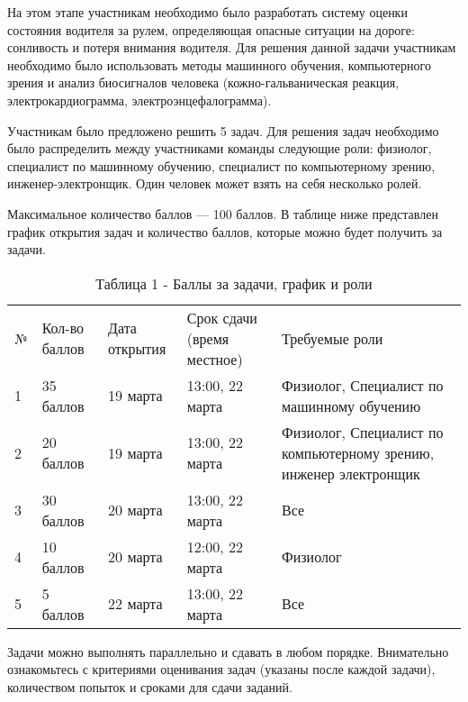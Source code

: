 На этом этапе участникам необходимо было разработать систему оценки состояния водителя за рулем, определяющая опасные ситуации на дороге: сонливость и потеря внимания водителя. Для решения данной задачи участникам необходимо было использовать методы машинного обучения, компьютерного зрения и анализ биосигналов человека (кожно-гальваническая реакция, электрокардиограмма, электроэнцефалограмма).

Участникам было предложено решить 5 задач. Для решения задач необходимо было распределить между участниками команды следующие роли: физиолог, специалист по машинному обучению, специалист по компьютерному зрению, инженер-электронщик. Один человек может взять на себя несколько ролей. 

Максимальное количество баллов — 100 баллов. В таблице ниже представлен график открытия задач и количество баллов, которые можно будет получить за задачи.

\begin{table}[H]
    \caption{Таблица 1 - Баллы за задачи, график и роли}
    \begin{tabular}{|l|l|l|l|l|}
    № &	Кол-во баллов & Дата открытия & Срок сдачи (время местное) & Требуемые роли \\
    1 & 35 баллов & 19 марта & 13:00, 22 марта & Физиолог, Специалист по машинному обучению \\
    2 & 20 баллов & 19 марта & 13:00, 22 марта & Физиолог, Специалист по компьютерному зрению, инженер электронщик \\
    3 & 30 баллов & 20 марта & 13:00, 22 марта & Все \\
    4 & 10 баллов & 20 марта & 12:00, 22 марта & Физиолог \\
    5 & 5 баллов & 22 марта & 13:00, 22 марта & Все \\
    \end{tabular}
\end{table}

Задачи можно выполнять параллельно и сдавать в любом порядке. Внимательно ознакомьтесь с критериями оценивания задач (указаны после каждой задачи), количеством попыток и сроками для сдачи заданий.